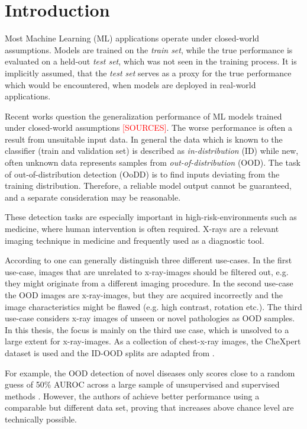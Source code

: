 \section{Introduction}
\raggedbottom
Most Machine Learning (ML) applications operate under closed-world assumptions.
Models are trained on the \textit{train set}, while the true performance is evaluated on a held-out \textit{test set}, which was not seen in the training process.
It is implicitly assumed, that the \textit{test set} serves as a proxy for the true performance which would be encountered, when models are deployed in real-world applications.
\par
Recent works question the generalization performance of ML models trained under closed-world assumptions \textcolor{red}{[SOURCES]}.
The worse performance is often a result from unsuitable input data.
In general the data which is known to the classifier (train and validation set) is described as \textit{in-distribution} (ID) while new, often unknown data represents samples from \textit{out-of-distribution} (OOD).
The task of out-of-distribution detection (OoDD) is to find inputs deviating from the training distribution.
Therefore, a reliable model output cannot be guaranteed, and a separate consideration may be reasonable.
\par
These detection tasks are especially important in high-risk-environments such as medicine, where human intervention is often required.
X-rays are a relevant imaging technique in medicine and frequently used as a diagnostic tool.
\par
According to \citep{Cao2020} one can generally distinguish three different use-cases.
In the first use-case, images that are unrelated to x-ray-images should be filtered out, e.g. they might originate from a different imaging procedure.
In the second use-case the OOD images are x-ray-images, but they are acquired incorrectly and the image characteristics might be flawed (e.g. high contrast, rotation etc.).
The third use-case considers x-ray images of unseen or novel pathologies as OOD samples.
In this thesis, the focus is mainly on the third use case, which is unsolved to a large extent for x-ray-images.
As a collection of chest-x-ray images, the CheXpert dataset is used \citep{Irvin2019} and the ID-OOD splits are adapted from \citep{Berger2021}.
\par
For example, the OOD detection of novel diseases only scores close to a random guess of 50\% AUROC across a large sample of unsupervised and supervised methods \citep{Cao2020}.
However, the authors of \citep{Berger2021} achieve better performance using a comparable but different data set, proving that increases above chance level are technically possible.
